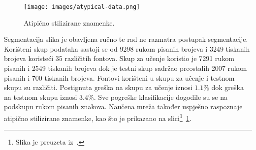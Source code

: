 \begin{figure}[htb]
    \centering
    \texttt{[image: images/atypical-data.png]}
    \caption{Atipično stilizirane znamenke.}
    \label{fig:atipicno-stilizirane-znamenke}
\end{figure}
Segmentacija slika je obavljena ručno te rad ne razmatra postupak segmentacije. Korišteni skup podataka sastoji se od
9298 rukom pisanih brojeva i 3249 tiskanih brojeva koristeći 35 različitih fontova. Skup za učenje koristio je 7291
rukom pisanih i 2549 tiskanih brojeva dok je testni skup sadržao preostalih 2007 rukom pisanih i 700 tiskanih brojeva.
Fontovi korišteni u skupu za učenje i testnom skupu su različiti. Postignuta greška na skupu za učenje iznosi $1.1\%$
dok greška na testnom skupu iznosi $3.4\%$. Sve pogreške klasifikacije dogodile su se na podskupu rukom pisanih znakova.
Naučena mreža također uspješno raspoznaje atipično stilizirane znamenke, kao što je prikazano na
slici\footnote{Slika je preuzeta iz\ \citep{leCun1990}.}\ \ref{fig:atipicno-stilizirane-znamenke}.

